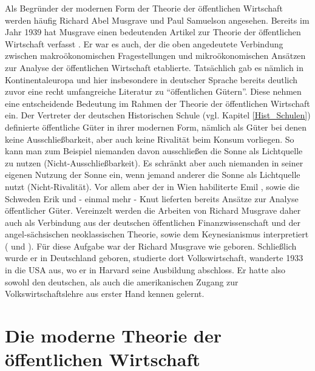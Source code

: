 Als Begründer der modernen Form der Theorie der öffentlichen Wirtschaft werden häufig Richard Abel Musgrave und Paul Samuelson angesehen. Bereits im Jahr 1939 hat Musgrave einen bedeutenden Artikel zur Theorie der öffentlichen Wirtschaft verfasst \parencite{Musgrave1939}. Er war es auch, der die oben angedeutete Verbindung zwischen makroökonomischen Fragestellungen und mikroökonomischen Ansätzen zur Analyse der öffentlichen Wirtschaft etablierte. Tatsächlich gab es nämlich in Kontinentaleuropa und hier insbesondere in deutscher Sprache bereits deutlich zuvor eine recht umfangreiche Literatur zu "`öffentlichen Gütern"'. Diese nehmen eine entscheidende Bedeutung im Rahmen der Theorie der öffentlichen Wirtschaft ein. Der Vertreter der deutschen Historischen Schule (vgl. Kapitel \ref{Hist_Schulen}) \textcite{Wagner1892} definierte öffentliche Güter in ihrer modernen Form, nämlich als Güter bei denen keine Ausschließbarkeit, aber auch keine Rivalität beim Konsum vorliegen. So kann man zum Beispiel niemanden davon ausschließen die Sonne als Lichtquelle zu nutzen (Nicht-Ausschließbarkeit). Es schränkt aber auch niemanden in seiner eigenen Nutzung der Sonne ein, wenn jemand anderer die Sonne als Lichtquelle nutzt (Nicht-Rivalität). Vor allem aber der in Wien habiliterte Emil \textcite{Sax1887}, sowie die Schweden Erik \textcite{Lindhal1928} und - einmal mehr - Knut \textcite{Wicksell1896} lieferten bereits Ansätze zur Analyse öffentlicher Güter. Vereinzelt werden die Arbeiten von Richard Musgrave daher auch als Verbindung aus der deutschen öffentlichen Finanzwissenschaft und der angel-sächsischen neoklassischen Theorie, sowie dem Keynesianismus interpretiert (\textcite[S. 13]{Sinn2007} und \textcite[S. 589]{Sturn2007}). Für diese Aufgabe war der Richard Musgrave wie geboren. Schließlich wurde er in Deutschland geboren, studierte dort Volkswirtschaft, wanderte 1933 in die USA aus, wo er in Harvard seine Ausbildung abschloss. Er hatte also sowohl den deutschen, als auch die amerikanischen Zugang zur Volkswirtschaftslehre aus erster Hand kennen gelernt.

\section{Die moderne Theorie der öffentlichen Wirtschaft}
\label{Beginn_Public_Economy}

